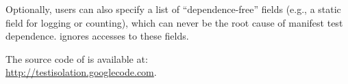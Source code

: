 Optionally, users can also specify a
list of ``dependence-free'' fields (e.g., a static field for
logging or counting), which can never be the root cause of manifest test dependence.
\ourtool ignores accesses to these fields.












The source code of \ourtool is available at:\\ \url{http://testisolation.googlecode.com}.




